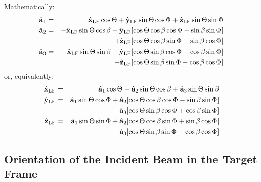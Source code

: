 Mathematically:
\begin{eqnarray}
{\hat{\bf a}}_1 &=&   \hat{\bf x}_{\rm LF} \cos\Theta 
+ \hat{\bf y}_{\rm LF} \sin\Theta \cos\Phi 
+ \hat{\bf z}_{\rm LF} \sin\Theta \sin\Phi
	\\
{\hat{\bf a}}_2 &=& - \hat{\bf x}_{\rm LF} \sin\Theta \cos\beta 
+ \hat{\bf y}_{\rm LF} [\cos\Theta \cos\beta \cos\Phi-\sin\beta \sin\Phi] \nonumber\\
&&+ \hat{\bf z}_{\rm LF} [\cos\Theta \cos\beta \sin\Phi+\sin\beta \cos\Phi]
	\\
{\hat{\bf a}}_3 &=&   \hat{\bf x}_{\rm LF} \sin\Theta \sin\beta 
- \hat{\bf y}_{\rm LF} [\cos\Theta \sin\beta \cos\Phi+\cos\beta \sin\Phi] \nonumber\\
  &&         - \hat{\bf z}_{\rm LF} [\cos\Theta \sin\beta \sin\Phi-\cos\beta \cos\Phi]
\end{eqnarray}
or, equivalently:
\begin{eqnarray}
\hat{\bf x}_{\rm LF} &=&   {\hat{\bf a}}_1 \cos\Theta
           - {\hat{\bf a}}_2 \sin\Theta \cos\beta
           + {\hat{\bf a}}_3 \sin\Theta \sin\beta \\
\hat{\bf y}_{\rm LF} &=&   {\hat{\bf a}}_1 \sin\Theta \cos\Phi
           + {\hat{\bf a}}_2 [\cos\Theta \cos\beta \cos\Phi-\sin\beta \sin\Phi]
\nonumber\\
&&         - {\hat{\bf a}}_3 [\cos\Theta \sin\beta \cos\Phi+\cos\beta \sin\Phi]
\\
\hat{\bf z}_{\rm LF} &=&   {\hat{\bf a}}_1 \sin\Theta \sin\Phi
           + {\hat{\bf a}}_2 [\cos\Theta \cos\beta \sin\Phi+\sin\beta \cos\Phi]
\nonumber\\
&&         - {\hat{\bf a}}_3 [\cos\Theta \sin\beta \sin\Phi-\cos\beta \cos\Phi]
\end{eqnarray}

\subsection{ Orientation of the Incident Beam in the Target Frame}

